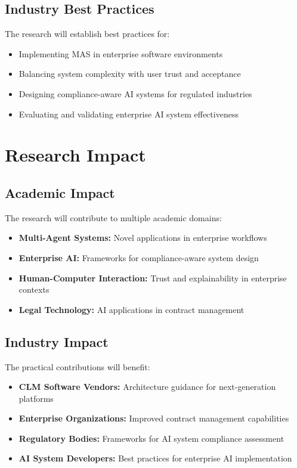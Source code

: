 \subsection{Industry Best Practices}
The research will establish best practices for:
\begin{itemize}
    \item Implementing MAS in enterprise software environments
    \item Balancing system complexity with user trust and acceptance
    \item Designing compliance-aware AI systems for regulated industries
    \item Evaluating and validating enterprise AI system effectiveness
\end{itemize}

\section{Research Impact}

\subsection{Academic Impact}
The research will contribute to multiple academic domains:
\begin{itemize}
    \item \textbf{Multi-Agent Systems:} Novel applications in enterprise workflows
    \item \textbf{Enterprise AI:} Frameworks for compliance-aware system design
    \item \textbf{Human-Computer Interaction:} Trust and explainability in enterprise contexts
    \item \textbf{Legal Technology:} AI applications in contract management
\end{itemize}

\subsection{Industry Impact}
The practical contributions will benefit:
\begin{itemize}
    \item \textbf{CLM Software Vendors:} Architecture guidance for next-generation platforms
    \item \textbf{Enterprise Organizations:} Improved contract management capabilities
    \item \textbf{Regulatory Bodies:} Frameworks for AI system compliance assessment
    \item \textbf{AI System Developers:} Best practices for enterprise AI implementation
\end{itemize}


